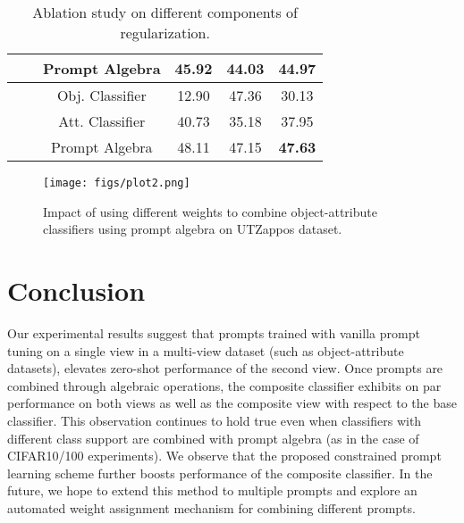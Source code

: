 \documentclass[10pt,twocolumn,letterpaper]{article}
\newcommand{\cmark}{\ding{51}}%
\begin{document}
\begin{table}[]
{\begin{tabular}{@{}cccccc@{}}
                                                                  &                                                              & Prompt Algebra  & 45.92              & 44.03           & 44.97          \\ \hline 
\multirow{3}{*}{\cmark}                                                & \multirow{3}{*}{ \cmark }                                           & Obj. Classifier & 12.90              & 47.36           & 30.13          \\
                                                                  &                                                              & Att. Classifier & 40.73              & 35.18           & 37.95          \\
                                                                  &                                                              & Prompt Algebra  & 48.11              & 47.15           & \textbf{47.63} \\ \hline 
\end{tabular}
}
\caption{Ablation study on different components of regularization.} \label{tbl:ablation}
\end{table}



\begin{figure}[h] 
\centering
\texttt{[image: figs/plot2.png]} 
\caption{Impact of using different weights to combine object-attribute classifiers using prompt algebra on UTZappos dataset.}
\label{fig:weights}
\end{figure}

\section{Conclusion}
Our experimental results suggest that prompts trained with vanilla prompt tuning on a single view in a multi-view dataset (such as object-attribute datasets), elevates zero-shot performance of the second view. Once prompts are combined through algebraic operations, the composite classifier exhibits on par performance on both views as well as the composite view with respect to the base classifier. This observation continues to hold true even when classifiers with different class support are combined with prompt algebra (as in the case of CIFAR10/100 experiments). We observe that the proposed constrained prompt learning scheme further boosts performance of the composite classifier. In the future, we hope to extend this method to multiple prompts and explore an automated weight assignment mechanism for combining different prompts.
\end{document}
